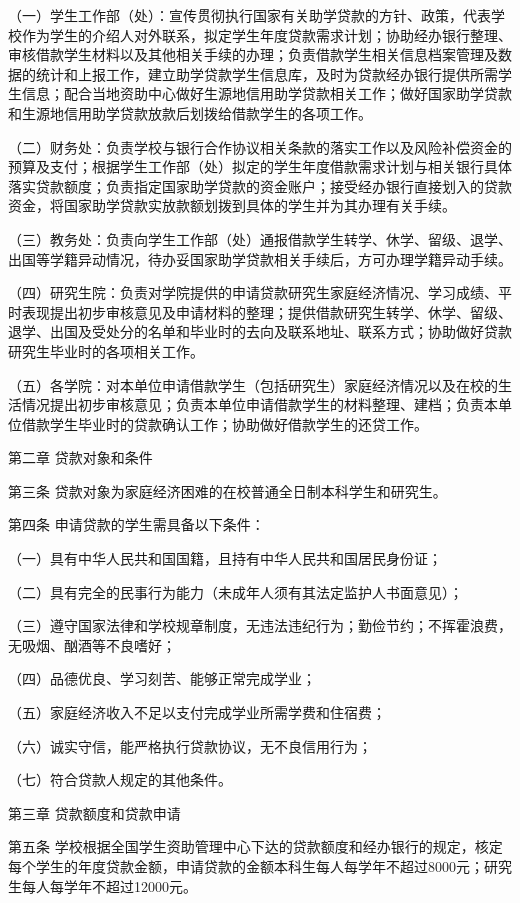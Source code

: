\documentclass[UTF8,12pt,a4paper]{report}
\begin{document}
（一）学生工作部（处）：宣传贯彻执行国家有关助学贷款的方针、政策，代表学校作为学生的介绍人对外联系，拟定学生年度贷款需求计划；协助经办银行整理、审核借款学生材料以及其他相关手续的办理；负责借款学生相关信息档案管理及数据的统计和上报工作，建立助学贷款学生信息库，及时为贷款经办银行提供所需学生信息；配合当地资助中心做好生源地信用助学贷款相关工作；做好国家助学贷款和生源地信用助学贷款放款后划拨给借款学生的各项工作。

（二）财务处：负责学校与银行合作协议相关条款的落实工作以及风险补偿资金的预算及支付；根据学生工作部（处）拟定的学生年度借款需求计划与相关银行具体落实贷款额度；负责指定国家助学贷款的资金账户；接受经办银行直接划入的贷款资金，将国家助学贷款实放款额划拨到具体的学生并为其办理有关手续。

（三）教务处：负责向学生工作部（处）通报借款学生转学、休学、留级、退学、出国等学籍异动情况，待办妥国家助学贷款相关手续后，方可办理学籍异动手续。

（四）研究生院：负责对学院提供的申请贷款研究生家庭经济情况、学习成绩、平时表现提出初步审核意见及申请材料的整理；提供借款研究生转学、休学、留级、退学、出国及受处分的名单和毕业时的去向及联系地址、联系方式；协助做好贷款研究生毕业时的各项相关工作。

（五）各学院：对本单位申请借款学生（包括研究生）家庭经济情况以及在校的生活情况提出初步审核意见；负责本单位申请借款学生的材料整理、建档；负责本单位借款学生毕业时的贷款确认工作；协助做好借款学生的还贷工作。

第二章 贷款对象和条件

第三条 贷款对象为家庭经济困难的在校普通全日制本科学生和研究生。

第四条 申请贷款的学生需具备以下条件：

（一）具有中华人民共和国国籍，且持有中华人民共和国居民身份证；

（二）具有完全的民事行为能力（未成年人须有其法定监护人书面意见）；

（三）遵守国家法律和学校规章制度，无违法违纪行为；勤俭节约；不挥霍浪费，无吸烟、酗酒等不良嗜好；

（四）品德优良、学习刻苦、能够正常完成学业；

（五）家庭经济收入不足以支付完成学业所需学费和住宿费；

（六）诚实守信，能严格执行贷款协议，无不良信用行为；

（七）符合贷款人规定的其他条件。

第三章 贷款额度和贷款申请

第五条 学校根据全国学生资助管理中心下达的贷款额度和经办银行的规定，核定每个学生的年度贷款金额，申请贷款的金额本科生每人每学年不超过8000元；研究生每人每学年不超过12000元。
\end{document}
